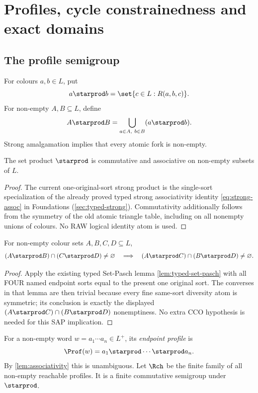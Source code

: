 \section{Profiles, cycle constrainedness and exact domains}
\label{sec:profiles}

\subsection{The profile semigroup}

For colours \(a,b\in L\), put
\[
  a\starprod b=\set{c\in L:R(a,b,c)}.
\]
For non-empty \(A,B\subseteq L\), define
\[
  A\starprod B=\bigcup_{a\in A,\ b\in B}(a\starprod b).
\]
Strong amalgamation implies that every atomic fork is non-empty.

\begin{lemma}[Associativity]\label{lem:associativity}
The set product \(\starprod\) is commutative and associative on non-empty
subsets of \(L\).
\end{lemma}

\begin{proof}
The current one-original-sort strong product is the
single-sort specialization of the already proved
typed strong associativity identity
\eqref{eq:strong-assoc} in Foundations
(\cref{sec:typed-strong}).
Commutativity additionally follows from the
symmetry of the old atomic triangle table,
including on all nonempty unions of colours.
No RAW logical identity atom is used.
\end{proof}

\begin{lemma}\label{lem:set-pasch}
For non-empty colour sets \(A,B,C,D\subseteq L\),
\[
 (A\starprod B)\cap(C\starprod D)\neq\varnothing
 \quad\Longrightarrow\quad
 (A\starprod C)\cap(B\starprod D)\neq\varnothing.
\]
\end{lemma}

\begin{proof}
Apply the existing typed Set-Pasch lemma
\cref{lem:typed-set-pasch} with all FOUR
named endpoint sorts equal to the present
one original sort. The converses in that
lemma are then trivial because every fine
same-sort diversity atom is symmetric;
its conclusion is exactly the displayed
\((A\starprod C)\cap(B\starprod D)\)
nonemptiness. No extra CCO hypothesis is
needed for this SAP implication.
\end{proof}

For a non-empty word \(w=a_1\cdots a_n\in L^+\), its \emph{endpoint
profile} is
\[
  \Prof(w)=a_1\starprod\cdots\starprod a_n.
\]
By \cref{lem:associativity} this is unambiguous.  Let
\(\Rch\) be the finite family of all non-empty reachable profiles.  It is a
finite commutative semigroup under \(\starprod\).

